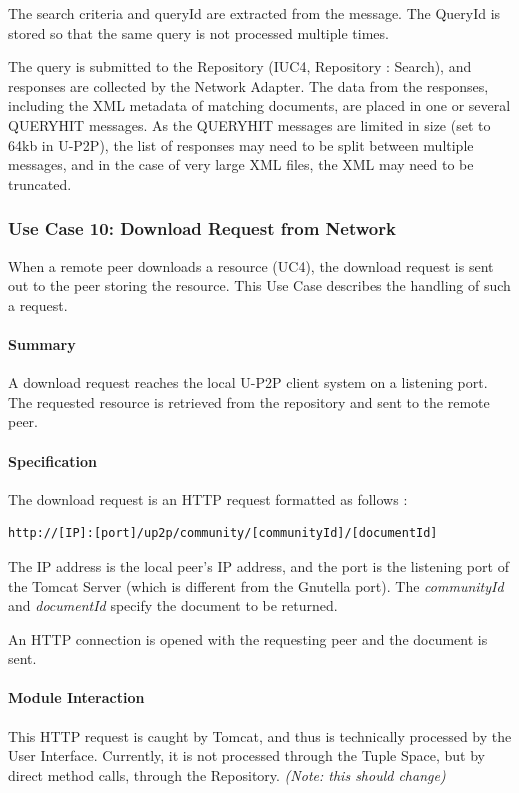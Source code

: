 \documentclass[titlepage]{article}%
\begin{document}
The search criteria and queryId are extracted from the message. The QueryId is stored so that the same query is not processed multiple times. 

The query is submitted to the Repository (IUC4, Repository : Search), and responses are collected by the Network Adapter. The data from the responses, including the XML metadata of matching documents, are placed in one or several QUERYHIT messages. As the QUERYHIT messages are limited in size (set to 64kb in U-P2P), the list of responses may need to be split between multiple messages, and in the case of very large XML files, the XML may need to be truncated.

\subsubsection{Use Case 10: Download Request from Network}

When a remote peer downloads a resource (UC4), the download request is sent out to the peer storing the resource. This Use Case describes the handling of such a request. 

\paragraph{Summary}
A download request reaches the local U-P2P client system on a listening port. The requested resource is retrieved from the repository and sent to the remote peer.

\paragraph{Specification}
The download request is an HTTP request formatted as follows : 
\begin{verbatim}
http://[IP]:[port]/up2p/community/[communityId]/[documentId]
\end{verbatim}
The IP address is the local peer's IP address, and the port is the listening port of the Tomcat Server (which is different from the Gnutella port).
The \emph{communityId} and \emph{documentId} specify the document to be returned.

An HTTP connection is opened with the requesting peer and the document is sent.

\paragraph{Module Interaction}
This HTTP request is caught by Tomcat, and thus is technically processed by the User Interface.  
Currently, it is not processed through the Tuple Space, but by direct method calls, through the Repository.
\emph{(Note: this should change)}
\end{document}
